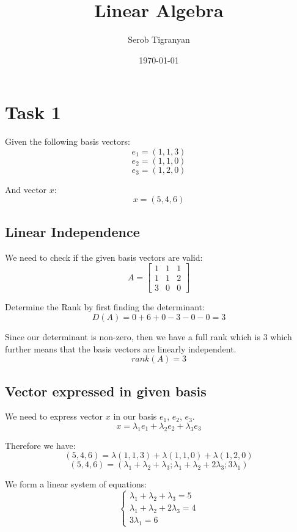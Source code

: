 \documentclass[11pt]{article}
\author{Serob Tigranyan}
\date{\today}
\title{Linear Algebra}
\begin{document}
\maketitle
\tableofcontents

\newpage
\section{Task 1}
\label{sec:org8a184da}
Given the following basis vectors:
\[
e_1=(1,1,3)
\]
\[
e_2=(1,1,0)
\]
\[
e_3=(1,2,0)
\]

And vector \(x\):
\[
x=(5,4,6)
\]
\subsection{Linear Independence}
\label{sec:org41480b3}
We need to check if the given basis vectors are valid:
\[
A =
\begin{bmatrix}
1 & 1 & 1 \\
1 & 1 & 2 \\
3 & 0 & 0
\end{bmatrix}
\]

Determine the Rank by first finding the determinant:
\[
D(A) = 0 + 6 + 0 -3 - 0 -0 = 3
\]

Since our determinant is non-zero, then we have a full rank which is 3 which further means that the basis vectors are linearly independent. 
\[
rank(A) = 3
\]
\subsection{Vector expressed in given basis}
\label{sec:org1d42f87}
We need to express vector \(x\) in our basis \(e_1\), \(e_2\), \(e_3\).
\[
x=\lambda_1 e_1 + \lambda_2 e_2 + \lambda_3 e_3
\]

Therefore we have:
\[
(5,4,6)=\lambda (1,1,3) + \lambda (1,1,0) + \lambda (1,2,0)
\]
\[
(5,4,6)=(\lambda_1 + \lambda_2 + \lambda_3; \lambda_1 + \lambda_2 + 2 \lambda_3; 3 \lambda_1)
\]

We form a linear system of equations:
\[
\left\{
\begin{aligned}
\lambda_1 + \lambda_2 + \lambda_3 = 5 \\
\lambda_1 + \lambda_2 + 2 \lambda_3 = 4 \\
3 \lambda_1 = 6
\end{aligned}
\]
\end{document}
